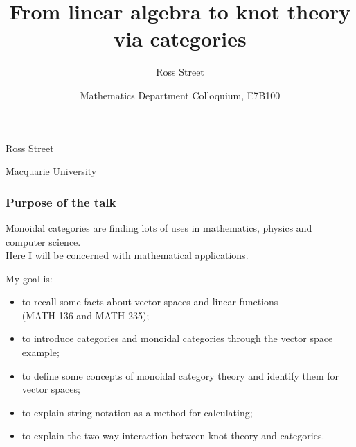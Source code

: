 \documentclass{beamer}
\title[From lin alg to knots via categories] %
{\textbf{From linear algebra to knot theory via categories}}
\author{Ross Street}
\institute{Macquarie University}
\date[12 Aug 2013]{\small Mathematics Department Colloquium, E7B100}
\begin{document}


\begin{frame}%

  \begin{centering}
    {\inserttitle

\medskip 

{\small Ross Street}

{\small Macquarie University} 

\medskip
{}
}

\vfill

\centerline{\insertdate}

  \end{centering}


\end{frame}





\begin{frame}
  \frametitle{Purpose of the talk}

Monoidal categories are finding lots of uses in mathematics, physics and computer science. \\
Here I will be concerned with mathematical applications.
\pause

My goal is:
 \begin{itemize}
\item<1-> to recall some facts about vector spaces and linear functions \\ (MATH 136 and MATH 235);
\pause
\item<2-> to introduce categories and monoidal categories through the vector space example;
\pause
\item<3-> to define some concepts of monoidal category theory and identify them for vector spaces;
\pause
\item<4-> to explain string notation as a method for calculating;
\pause
\item<5-> to explain the two-way interaction between knot theory and categories.

\end{itemize}

\end{frame}
\end{document}
